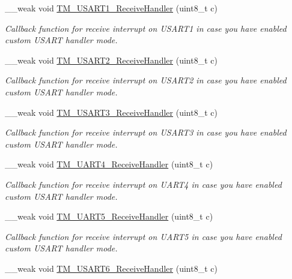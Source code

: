 \begin{DoxyCompactItemize}
\+\_\+\+\_\+weak void \hyperlink{group___t_m___u_s_a_r_t___functions_gafbf9e2222953815c9f35cd46863dbc26}{T\+M\+\_\+\+U\+S\+A\+R\+T1\+\_\+\+Receive\+Handler} (uint8\+\_\+t c)
\begin{DoxyCompactList}\small\item\em Callback function for receive interrupt on U\+S\+A\+R\+T1 in case you have enabled custom U\+S\+A\+R\+T handler mode. \end{DoxyCompactList}\item 
\+\_\+\+\_\+weak void \hyperlink{group___t_m___u_s_a_r_t___functions_ga21823124b3d98ea2085671f4a5af6017}{T\+M\+\_\+\+U\+S\+A\+R\+T2\+\_\+\+Receive\+Handler} (uint8\+\_\+t c)
\begin{DoxyCompactList}\small\item\em Callback function for receive interrupt on U\+S\+A\+R\+T2 in case you have enabled custom U\+S\+A\+R\+T handler mode. \end{DoxyCompactList}\item 
\+\_\+\+\_\+weak void \hyperlink{group___t_m___u_s_a_r_t___functions_ga868eb8844f04487e714b63b016a93bae}{T\+M\+\_\+\+U\+S\+A\+R\+T3\+\_\+\+Receive\+Handler} (uint8\+\_\+t c)
\begin{DoxyCompactList}\small\item\em Callback function for receive interrupt on U\+S\+A\+R\+T3 in case you have enabled custom U\+S\+A\+R\+T handler mode. \end{DoxyCompactList}\item 
\+\_\+\+\_\+weak void \hyperlink{group___t_m___u_s_a_r_t___functions_gada9d723469cf9d7d0ac11930b8e14f2a}{T\+M\+\_\+\+U\+A\+R\+T4\+\_\+\+Receive\+Handler} (uint8\+\_\+t c)
\begin{DoxyCompactList}\small\item\em Callback function for receive interrupt on U\+A\+R\+T4 in case you have enabled custom U\+S\+A\+R\+T handler mode. \end{DoxyCompactList}\item 
\+\_\+\+\_\+weak void \hyperlink{group___t_m___u_s_a_r_t___functions_ga4338d265fa58103332ea234f63594b81}{T\+M\+\_\+\+U\+A\+R\+T5\+\_\+\+Receive\+Handler} (uint8\+\_\+t c)
\begin{DoxyCompactList}\small\item\em Callback function for receive interrupt on U\+A\+R\+T5 in case you have enabled custom U\+S\+A\+R\+T handler mode. \end{DoxyCompactList}\item 
\+\_\+\+\_\+weak void \hyperlink{group___t_m___u_s_a_r_t___functions_ga65c1d6a6bcc2dbd40ea0e7cbf5e924de}{T\+M\+\_\+\+U\+S\+A\+R\+T6\+\_\+\+Receive\+Handler} (uint8\+\_\+t c)

\end{DoxyCompactItemize}
